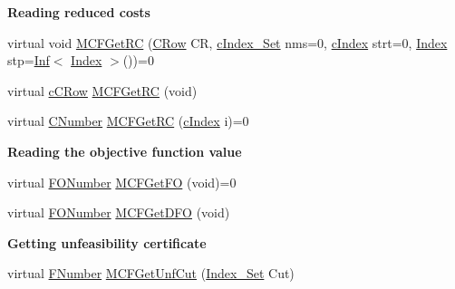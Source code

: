 \begin{Indent}\textbf{ Reading reduced costs}\par
\begin{DoxyCompactItemize}
\item 
virtual void \mbox{\hyperlink{class_m_c_f_class_a361d84ae42041fdbf3824d45fc4c54aa}{M\+C\+F\+Get\+RC}} (\mbox{\hyperlink{class_m_c_f_class_a62409402be4e4b301e1a568f99f877be}{C\+Row}} CR, \mbox{\hyperlink{class_m_c_f_class_a81575b2d4e4d5636b17170432150ae69}{c\+Index\+\_\+\+Set}} nms=0, \mbox{\hyperlink{class_m_c_f_class_a76aaabb20535c51a2752b93f6c38fe54}{c\+Index}} strt=0, \mbox{\hyperlink{class_m_c_f_class_ad53d6229d7ec28555a9c9c2fd9abf773}{Index}} stp=\mbox{\hyperlink{class_o_p_ttypes__di__unipi__it_1_1_inf}{Inf}}$<$ \mbox{\hyperlink{class_m_c_f_class_ad53d6229d7ec28555a9c9c2fd9abf773}{Index}} $>$())=0
\item 
virtual \mbox{\hyperlink{class_m_c_f_class_ab700102e9ba8bb6015be6818d4e99097}{c\+C\+Row}} \mbox{\hyperlink{class_m_c_f_class_af027cee8179a876a4879c73820c380d1}{M\+C\+F\+Get\+RC}} (void)
\item 
virtual \mbox{\hyperlink{class_m_c_f_class_a24d0627ba8213afe1ec4ebeb4508e8f1}{C\+Number}} \mbox{\hyperlink{class_m_c_f_class_a7c103b582c910ccfda354032aae5722e}{M\+C\+F\+Get\+RC}} (\mbox{\hyperlink{class_m_c_f_class_a76aaabb20535c51a2752b93f6c38fe54}{c\+Index}} i)=0
\end{DoxyCompactItemize}
\end{Indent}
\begin{Indent}\textbf{ Reading the objective function value}\par
\begin{DoxyCompactItemize}
\item 
virtual \mbox{\hyperlink{class_m_c_f_class_af5ee7b3099b0bc780a6a4b43629488fa}{F\+O\+Number}} \mbox{\hyperlink{class_m_c_f_class_a109d7c021feda837d8ca5051fc24b6ea}{M\+C\+F\+Get\+FO}} (void)=0
\item 
virtual \mbox{\hyperlink{class_m_c_f_class_af5ee7b3099b0bc780a6a4b43629488fa}{F\+O\+Number}} \mbox{\hyperlink{class_m_c_f_class_aca66f278ea62640af8e54590c687d715}{M\+C\+F\+Get\+D\+FO}} (void)
\end{DoxyCompactItemize}
\end{Indent}
\begin{Indent}\textbf{ Getting unfeasibility certificate}\par
\begin{DoxyCompactItemize}
\item 
virtual \mbox{\hyperlink{class_m_c_f_class_aeea3e5951d222b2a8e57de1b4246a909}{F\+Number}} \mbox{\hyperlink{class_m_c_f_class_a30483c3e5699b77f528c2e6f33c80ece}{M\+C\+F\+Get\+Unf\+Cut}} (\mbox{\hyperlink{class_m_c_f_class_ace3388eb329ff0551a0b86b6c67e33d8}{Index\+\_\+\+Set}} Cut)
\end{DoxyCompactItemize}
\end{Indent}
